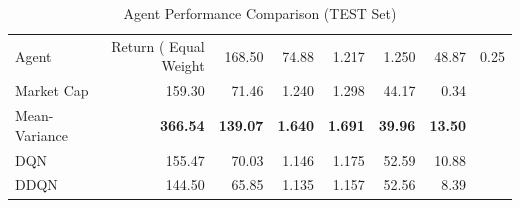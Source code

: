 \begin{table}[htbp]
\centering
\caption{Agent Performance Comparison (TEST Set)}
\label{tab:agent_comparison}
\begin{tabular}{lrrrrrr}
\toprule
Agent & Return (%
\midrule
Equal Weight & 168.50 & 74.88 & 1.217 & 1.250 & 48.87 & 0.25 \\
Market Cap & 159.30 & 71.46 & 1.240 & 1.298 & 44.17 & 0.34 \\
Mean-Variance & \textbf{366.54} & \textbf{139.07} & \textbf{1.640} & \textbf{1.691} & \textbf{39.96} & \textbf{13.50} \\
DQN & 155.47 & 70.03 & 1.146 & 1.175 & 52.59 & 10.88 \\
DDQN & 144.50 & 65.85 & 1.135 & 1.157 & 52.56 & 8.39 \\
\bottomrule
\end{tabular}
\end{table}